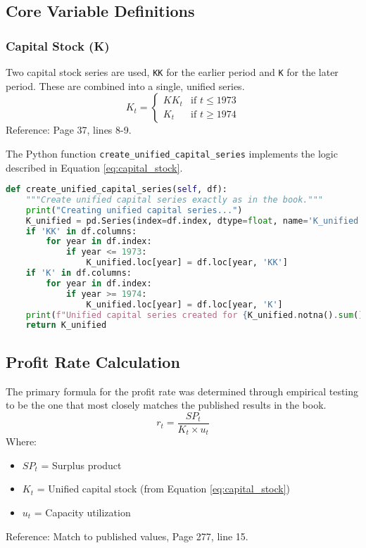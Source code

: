 \documentclass[12pt,a4paper]{article}
\begin{document}
\subsection{Core Variable Definitions}

\subsubsection{Capital Stock (K)}
Two capital stock series are used, \texttt{KK} for the earlier period and \texttt{K} for the later period. These are combined into a single, unified series.
\begin{equation}
K_t = \begin{cases}
KK_t & \text{if } t \leq 1973 \\
K_t & \text{if } t \geq 1974
\end{cases}
\label{eq:capital_stock}
\end{equation}
Reference: Page 37, lines 8-9.

\begin{tcolorbox}[colback=green!5!white,colframe=green!75!black,title=Implementation for Equation \ref{eq:capital_stock}]
The Python function \texttt{create\_unified\_capital\_series} implements the logic described in Equation \ref{eq:capital_stock}.
\begin{lstlisting}[language=Python, caption=Unified Capital Stock Series, label=code:capital_stock]
def create_unified_capital_series(self, df):
    """Create unified capital series exactly as in the book."""
    print("Creating unified capital series...")
    K_unified = pd.Series(index=df.index, dtype=float, name='K_unified')
    if 'KK' in df.columns:
        for year in df.index:
            if year <= 1973:
                K_unified.loc[year] = df.loc[year, 'KK']
    if 'K' in df.columns:
        for year in df.index:
            if year >= 1974:
                K_unified.loc[year] = df.loc[year, 'K']
    print(f"Unified capital series created for {K_unified.notna().sum()} years")
    return K_unified
\end{lstlisting}
\end{tcolorbox}

\subsection{Profit Rate Calculation}

The primary formula for the profit rate was determined through empirical testing to be the one that most closely matches the published results in the book.
\begin{equation}
r_t = \frac{SP_t}{K_t \times u_t}
\label{eq:profit_rate}
\end{equation}
Where:
\begin{itemize}
    \item $SP_t$ = Surplus product
    \item $K_t$ = Unified capital stock (from Equation \ref{eq:capital_stock})
    \item $u_t$ = Capacity utilization
\end{itemize}
Reference: Match to published values, Page 277, line 15.
\end{document}
